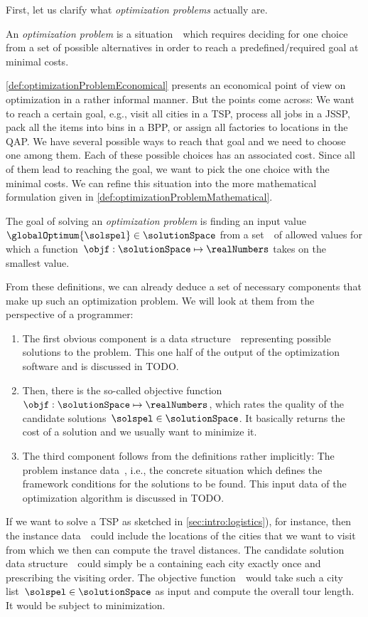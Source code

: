 First, let us clarify what \emph{optimization problems} actually are.%
%
\begin{definition}%
\label{def:optimizationProblemEconomical}%
An \emph{optimization problem} is a situation~\instance\ which requires deciding for one choice from a set of possible alternatives in order to reach a predefined/required goal at minimal costs.%
\end{definition}%
%
\autoref{def:optimizationProblemEconomical} presents an economical point of view on optimization in a rather informal manner.
But the points come across:
We want to reach a certain goal, e.g., visit all cities in a \gls{TSP}, process all jobs in a \gls{JSSP}, pack all the items into bins in a \gls{BPP}, or assign all factories to locations in the \gls{QAP}.
We have several possible ways to reach that goal and we need to choose one among them.
Each of these possible choices has an associated cost.
Since all of them lead to reaching the goal, we want to pick the one choice with the minimal costs.
We can refine this situation into the more mathematical formulation given in \autoref{def:optimizationProblemMathematical}.%
%
\begin{definition}%
\label{def:optimizationProblemMathematical}%
The goal of solving an \emph{optimization problem} is finding an input value~$\globalOptimum{\solspel}\in\solutionSpace$ from a set~\solutionSpace\ of allowed values for which a function~$\objf:\solutionSpace\mapsto\realNumbers$ takes on the smallest value.%
\end{definition}%
%
From these definitions, we can already deduce a set of necessary components that make up such an optimization problem.
We will look at them from the perspective of a programmer:%
%
\begin{enumerate}%
%
\item The first obvious component is a data structure~\solutionSpace\ representing possible solutions to the problem.
This one half of the output of the optimization software and is discussed in TODO.%
%
\item Then, there is the so-called objective function~$\objf:\solutionSpace\mapsto\realNumbers$, which rates the quality of the candidate solutions~$\solspel\in\solutionSpace$.
It basically returns the cost of a solution and we usually want to minimize it.%
%
\item The third component follows from the definitions rather implicitly:
The problem instance data~\instance, i.e., the concrete situation which defines the framework conditions for the solutions to be found.
This input data of the optimization algorithm is discussed in TODO.%
%
\end{enumerate}%
%
If we want to solve a \gls{TSP} as sketched in \autoref{sec:intro:logistics}), for instance, then the instance data~\instance\ could include the locations of the cities that we want to visit from which we then can compute the travel distances.
The candidate solution data structure~\solutionSpace\ could simply be a  containing each city exactly once and prescribing the visiting order.
The objective function~\objf\ would take such a city list~$\solspel\in\solutionSpace$ as input and compute the overall tour length.
It would be subject to minimization.

